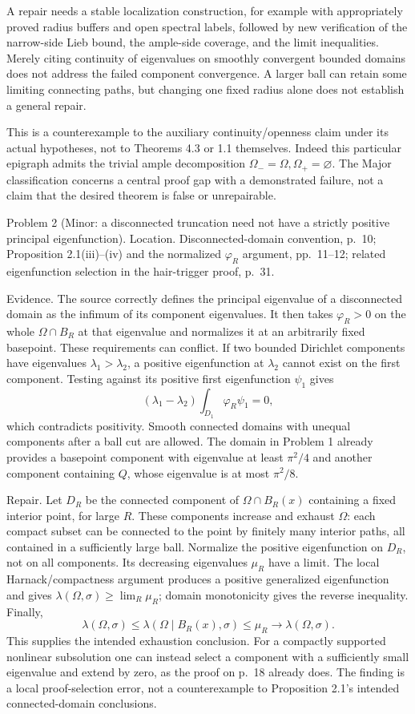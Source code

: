 \documentclass[10pt]{article}
\begin{document}
A repair needs a stable localization construction, for example with appropriately proved radius buffers and open spectral labels, followed by new verification of the narrow-side Lieb bound, the ample-side coverage, and the limit inequalities. Merely citing continuity of eigenvalues on smoothly convergent bounded domains does not address the failed component convergence. A larger ball can retain some limiting connecting paths, but changing one fixed radius alone does not establish a general repair.\par
This is a counterexample to the auxiliary continuity/openness claim under its actual hypotheses, not to Theorems 4.3 or 1.1 themselves. Indeed this particular epigraph admits the trivial ample decomposition \(\Omega_-=\Omega,\Omega_+=\varnothing\). The Major classification concerns a central proof gap with a demonstrated failure, not a claim that the desired theorem is false or unrepairable.\par
Problem 2 (Minor: a disconnected truncation need not have a strictly positive principal eigenfunction).  Location. Disconnected-domain convention, p. 10; Proposition 2.1(iii)–(iv) and the normalized \(\varphi_R\) argument, pp. 11–12; related eigenfunction selection in the hair-trigger proof, p. 31.\par
Evidence. The source correctly defines the principal eigenvalue of a disconnected domain as the infimum of its component eigenvalues. It then takes \(\varphi_R>0\) on the whole \(\Omega\cap B_R\) at that eigenvalue and normalizes it at an arbitrarily fixed basepoint. These requirements can conflict. If two bounded Dirichlet components have eigenvalues \(\lambda_1>\lambda_2\), a positive eigenfunction at \(\lambda_2\) cannot exist on the first component. Testing against its positive first eigenfunction \(\psi_1\) gives \[(\lambda_1-\lambda_2)\int_{D_1}\varphi_R\psi_1=0,\] which contradicts positivity. Smooth connected domains with unequal components after a ball cut are allowed. The domain in Problem 1 already provides a basepoint component with eigenvalue at least \(\pi^2/4\) and another component containing \(Q\), whose eigenvalue is at most \(\pi^2/8\).\par
Repair. Let \(D_R\) be the connected component of \(\Omega\cap B_R(x)\) containing a fixed interior point, for large \(R\). These components increase and exhaust \(\Omega\): each compact subset can be connected to the point by finitely many interior paths, all contained in a sufficiently large ball. Normalize the positive eigenfunction on \(D_R\), not on all components. Its decreasing eigenvalues \(\mu_R\) have a limit. The local Harnack/compactness argument produces a positive generalized eigenfunction and gives \(\lambda(\Omega,\sigma)\ge\lim_R\mu_R\); domain monotonicity gives the reverse inequality. Finally, \[\lambda(\Omega,\sigma)\le\lambda(\Omega\mid B_R(x),\sigma)
 \le\mu_R\longrightarrow\lambda(\Omega,\sigma).\] This supplies the intended exhaustion conclusion. For a compactly supported nonlinear subsolution one can instead select a component with a sufficiently small eigenvalue and extend by zero, as the proof on p. 18 already does. The finding is a local proof-selection error, not a counterexample to Proposition 2.1’s intended connected-domain conclusions.\par
\end{document}
